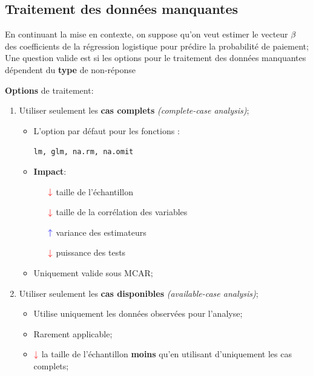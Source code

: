 \documentclass[10pt, french]{article}
\begin{document}
\begin{multicols*}{3}
\subsection*{Traitement des données manquantes}

En continuant la mise en contexte, on suppose qu'on veut estimer le vecteur $\mathbf{\beta}$ des coefficients de la régression logistique pour prédire la probabilité de paiement;
Une question valide est si les options pour le traitement des données manquantes dépendent du \textbf{type} de non-réponse

\textbf{Options} de traitement:
\begin{enumerate}[leftmargin = *]
	\item	Utiliser seulement les \textbf{cas complets} \textit{(complete-case analysis)};
		\begin{itemize}[leftmargin = *]
		\item	L'option par défaut pour les fonctions :
			\begin{center}
			\texttt{lm, glm, na.rm, na.omit}
			\end{center}
		\item	\textbf{Impact}:
			\begin{itemize}[leftmargin = *]
			\item[$\color{red}\downarrow$]	taille de l'échantillon	\\
			\item[$\color{red}\downarrow$]	taille de la corrélation des variables	\\
			\item[$\color{blue}\uparrow$]	variance des estimateurs	\\
			\item[$\color{red}\downarrow$]	puissance des tests	\\
			\end{itemize}
		\item	Uniquement valide sous \textcolor{ao(english)}{MCAR};
		\end{itemize}
	\item	Utiliser seulement les \textbf{cas disponibles} \textit{(available-case analysis)};
		\begin{itemize}[leftmargin = *]
		\item	Utilise uniquement les données observées pour l'analyse;
		\item	Rarement applicable;
		\item	$\color{red}\downarrow$ la taille de l'échantillon \textbf{moins} qu'en utilisant d'uniquement les cas complets;

\end{itemize}
\end{enumerate}
\end{multicols*}
\end{document}
